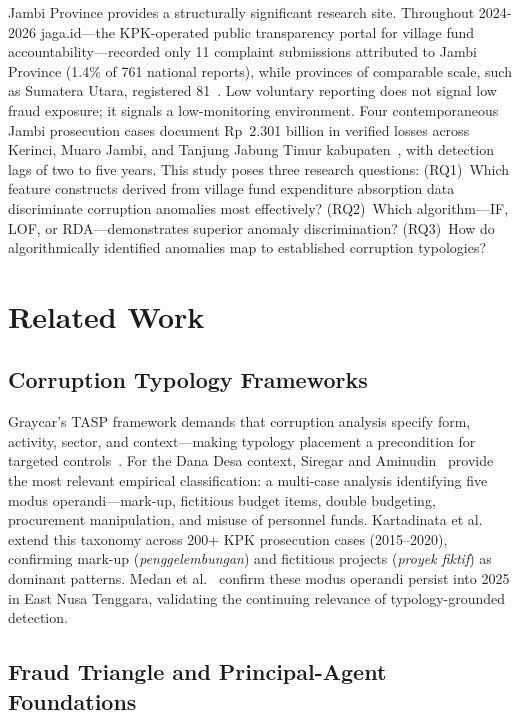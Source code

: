 \documentclass[3p,times,procedia]{elsarticle}
\begin{document}
Jambi Province provides a structurally significant research site. Throughout 2024-2026 jaga.id---the KPK-operated public transparency portal for village fund accountability---recorded only 11 complaint submissions attributed to Jambi Province (1.4\% of 761 national reports), while provinces of comparable scale, such as Sumatera Utara, registered 81~\cite{ref9}. Low voluntary reporting does not signal low fraud exposure; it signals a low-monitoring environment. Four contemporaneous Jambi prosecution cases document Rp~2.301 billion in verified losses across Kerinci, Muaro Jambi, and Tanjung Jabung Timur kabupaten~\cite{ref15,ref16,ref17,ref18}, with detection lags of two to five years. This study poses three research questions: (RQ1)~Which feature constructs derived from village fund expenditure absorption data discriminate corruption anomalies most effectively? (RQ2)~Which algorithm---IF, LOF, or RDA---demonstrates superior anomaly discrimination? (RQ3)~How do algorithmically identified anomalies map to established corruption typologies?

\section{Related Work}
\label{sec:related}

\subsection{Corruption Typology Frameworks}

Graycar's TASP framework demands that corruption analysis specify form, activity, sector, and context---making typology placement a precondition for targeted controls~\cite{ref19}. For the Dana Desa context, Siregar and Aminudin~\cite{ref13} provide the most relevant empirical classification: a multi-case analysis identifying five modus operandi---mark-up, fictitious budget items, double budgeting, procurement manipulation, and misuse of personnel funds. Kartadinata et al.~\cite{ref14} extend this taxonomy across 200+ KPK prosecution cases (2015--2020), confirming mark-up (\textit{penggelembungan}) and fictitious projects (\textit{proyek fiktif}) as dominant patterns. Medan et al.~\cite{ref20} confirm these modus operandi persist into 2025 in East Nusa Tenggara, validating the continuing relevance of typology-grounded detection.

\subsection{Fraud Triangle and Principal-Agent Foundations}
\end{document}
